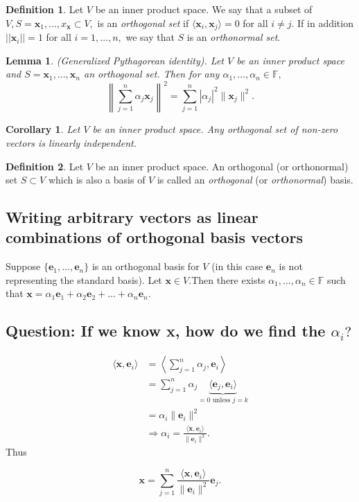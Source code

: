 \documentclass[12pt, a4paper]{article}
\newcommand{\bb}[1]{\mathbb{#1}}
\newcommand{\f}[2]{\frac{#1}{#2}}
\newcommand{\imply}{\Rightarrow}
\newcommand{\mb}[1]{\mathbf{#1}}
\theoremstyle{definition}
\newtheorem{definition}{Definition}[section]
\theoremstyle{plain}
\newtheorem{corollary}{Corollary}[theorem]
\newtheorem{lemma}[theorem]{Lemma}
\begin{document}
\begin{definition}
Let $V$ be an inner product space. We say that a subset of $V , S = {\mathbf{x}_1,\ldots,x_\mathbf{x}} \subset V,$ is an \textit{orthogonal set} if $\langle \mathbf{x}_i,\mathbf{x}_j\rangle = 0$ for all $i \neq j.$ If in addition $||\mathbf{x}_i|| = 1$ for all $i = 1,\ldots,n,$ we say that $S$ is an \textit{orthonormal set}.
\end{definition}

\begin{lemma}
 (Generalized Pythagorean identity). Let $V$ be an inner product space and $S = {\mathbf{x}_1,\ldots,\mathbf{x}_n}$ an \textit{orthogonal set}. Then for any $\alpha_1,\ldots,\alpha_n \in \bb{F},$ $$\left\|\sum_{j=1}^{n}\alpha_j\mb{x}_j\right\|^2=\sum_{j=1}^{n}|\alpha_j|^2\|\mb{x}_j\|^2.$$
\end{lemma}

\begin{corollary}
Let $V$ be an inner product space. Any orthogonal set of non-zero vectors is linearly independent.
\end{corollary}

\begin{definition}
Let $V$ be an inner product space. An orthogonal (or orthonormal) set $S \subset V$ which is also a basis of $V$ is called an \textit{orthogonal} (or \textit{orthonormal}) basis.
\end{definition}

\subsection{Writing arbitrary vectors as linear combinations of orthogonal basis vectors}

Suppose $\{\mathbf{e}_1,\ldots,\mathbf{e}_n\}$ is an orthogonal basis for $V$ (in this case $\mb{e}_n$ is not representing the standard basis). Let $\mathbf{x} \in V.$Then there exists $\alpha_1,\ldots,\alpha_n \in \bb{F}$ such that $\mathbf{x}=\alpha_1\mathbf{e}_1+\alpha_2\mathbf{e}_2+\ldots+\alpha_n\mathbf{e}_n.$ \\

\subsection*{Question: If we know x, how do we find the $\alpha_i?$}

$$\begin{aligned}
\langle \mathbf{x},\mathbf{e}_i \rangle &= \left\langle \sum_{j=1}^{n} \alpha_j, \mb{e}_i \right\rangle \\
&=\sum_{j=1}^{n}\alpha_j \underbrace{\langle \mb{e}_j,\mb{e}_i \rangle}_{=0 \text{ unless } j=k} \\
&= \alpha_i \|\mb{e}_i\|^2 \\
&\imply \alpha_i=\f{\langle \mb{x},\mb{e}_i \rangle}{\|\mb{e}_i\|^2}.
\end{aligned}$$ Thus \begin{tcolorbox}
$$\mb{x}=\sum_{j=1}^{n} \f{\langle \mb{x},\mb{e}_i \rangle}{\|\mb{e}_i\|^2} \mb{e}_j.$$
\end{tcolorbox}
\end{document}
